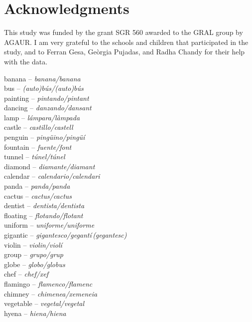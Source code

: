 \documentclass[output=paper,modfonts,nonflat,newtxmath]{langsci/langscibook}
\begin{document}
\section*{Acknowledgments}

This study was funded by the grant SGR 560 awarded to the GRAL group by AGAUR. I am very grateful to the schools and children that participated in the study, and to Ferran Gesa, Geòrgia Pujadas, and Radha Chandy for their help with the data.



\begin{multicols}{2}\noindent
banana  – \textit{banana/banana} \\
bus  – \textit{(auto)bús/(auto)bús}\\
painting  – \textit{pintando/pintant}\\
dancing  – \textit{danzando/dansant}\\
lamp  – \textit{lámpara/làmpada}\\
castle  – \textit{castillo/castell}\\
penguin  – \textit{pingüino/pingüí}\\
fountain  – \textit{fuente/font}\\
tunnel  – \textit{túnel/túnel} \\
diamond  – \textit{diamante/diamant} \\
calendar  – \textit{calendario/calendari} \\
panda  – \textit{panda/panda}\\
cactus  – \textit{cactus/cactus}\\
dentist  – \textit{dentista/dentista} \\
floating  – \textit{flotando/flotant} \\
uniform  – \textit{uniforme/uniforme} \\
gigantic – \textit{gigantesco/gegantí\,(gegantesc)}\\
violin  – \textit{violin/violí} \\
group  – \textit{grupo/grup} \\
globe  – \textit{globo/globus} \\
chef  – \textit{chef/xef} \\
flamingo  – \textit{flamenco/flamenc} \\
chimney  – \textit{chimenea/xemeneia} \\
vegetable  – \textit{vegetal/vegetal} \\
hyena  – \textit{hiena/hiena} \\

\end{multicols}
\end{document}
